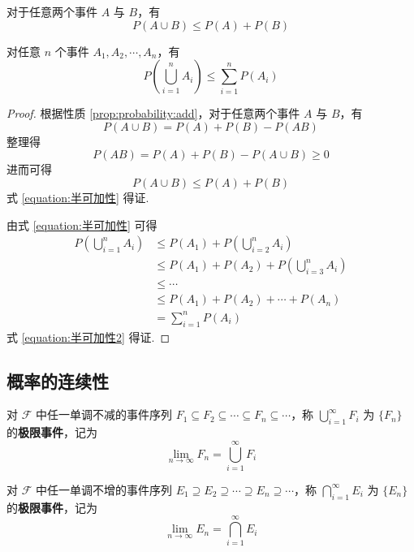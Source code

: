 \begin{corollary}[][半可加性]
    \indent 对于任意两个事件 $A$ 与 $B$，有
    \begin{equation} \label{equation:半可加性}
        P(A \cup B) \leqslant P(A) + P(B)
    \end{equation}

    对任意 $n$ 个事件 $A_1,A_2,\cdots,A_n$，有
    \begin{equation} \label{equation:半可加性2}
        P \left(\bigcup_{i=1}^n A_i \right) \leqslant \sum_{i=1}^n P(A_i)
    \end{equation}
\end{corollary}

\begin{proof}
    根据性质 \ref{prop:probability:add}，对于任意两个事件 $A$ 与 $B$，有
    $$
    P(A \cup B) = P(A) + P(B) - P(AB)
    $$
    整理得
    $$
    P(AB) = P(A) + P(B) - P(A \cup B) \geqslant 0
    $$
    进而可得
    $$
    P(A \cup B) \leqslant P(A) + P(B)
    $$
    式 \eqref{equation:半可加性} 得证.

    由式 \eqref{equation:半可加性} 可得
    $$
    \begin{aligned}
        P \left(\bigcup_{i=1}^n A_i \right) & \leqslant P(A_1) + P \left(\bigcup_{i=2}^n A_i \right) \\
        & \leqslant P(A_1) + P(A_2) + P \left(\bigcup_{i=3}^n A_i \right) \\
        & \leqslant \cdots \\
        & \leqslant P(A_1) + P(A_2) + \cdots + P(A_n) \\
        &= \sum_{i=1}^n P(A_i)
    \end{aligned}
    $$
    式 \eqref{equation:半可加性2} 得证.
\end{proof}

\subsection{概率的连续性}

\begin{definition}
    \indent 对 $\mathcal{F}$ 中任一单调不减的事件序列 $F_1 \subseteq F_2 \subseteq \cdots \subseteq F_n \subseteq \cdots$，称 $\displaystyle\bigcup_{i=1}^{\infty} F_i$ 为 $\{F_n\}$ 的\textbf{极限事件}，记为
    $$
    \lim_{n \to \infty} F_n = \bigcup_{i=1}^{\infty} F_i
    $$

    对 $\mathcal{F}$ 中任一单调不增的事件序列 $E_1 \supseteq E_2 \supseteq \cdots \supseteq E_n \supseteq \cdots$，称 $\displaystyle\bigcap_{i=1}^{\infty} E_i$ 为 $\{E_n\}$ 的\textbf{极限事件}，记为
    $$
    \lim_{n \to \infty} E_n = \bigcap_{i=1}^{\infty} E_i
    $$
\end{definition}

